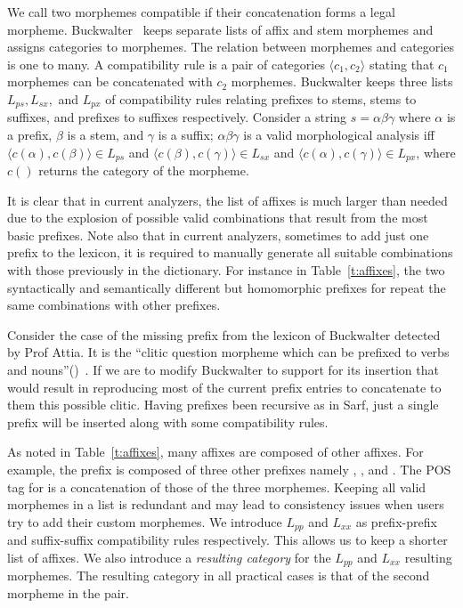 \documentclass[a4,12pt]{report}
\newcommand{\noTrRL}[1]{\transfalse\RL{#1}\transtrue}
\newcommand{\noTrnoVocRL}[1]{\transfalse\novocalize\noTrRL{#1}\vocalize\transtrue}
\begin{document}
We call two morphemes compatible if their concatenation
forms a legal morpheme. 
Buckwalter~\cite{Buckwalter:02} keeps separate lists 
of affix and stem morphemes and assigns categories to
morphemes. 
The relation between morphemes and categories is one 
to many. 
A compatibility rule is a pair of categories 
$\langle c_1, c_2\rangle$  stating that $c_1$ morphemes
can be concatenated with $c_2$ morphemes.
Buckwalter keeps three lists $L_{ps}, L_{sx},$ and $L_{px}$ 
of compatibility rules relating
prefixes to stems, stems to suffixes, and prefixes to suffixes
respectively. 
Consider a string $s=\alpha\beta\gamma$ where $\alpha$ is 
a prefix, $\beta$ is a stem, and $\gamma$ is a suffix;
$\alpha\beta\gamma$ is a 
valid morphological analysis iff
$\langle c(\alpha),c(\beta)\rangle \in L_{ps}$ and
$\langle c(\beta),c(\gamma)\rangle \in L_{sx}$ and
$\langle c(\alpha),c(\gamma)\rangle \in L_{px}$, where
$c()$ returns the category of the morpheme.

It is clear that in current analyzers, the list of affixes is much larger than needed
due to the explosion of possible valid combinations that result from the most basic 
prefixes. Note also that in current analyzers, sometimes to add just one prefix to the lexicon, it is required to
manually generate all suitable combinations with those previously in the dictionary.
For instance in Table~\ref{t:affixes}, the two syntactically and semantically different but homomorphic prefixes for 
repeat the same combinations with other prefixes.

Consider the case of the missing prefix from the lexicon of Buckwalter detected by Prof Attia. It is the 
``clitic question morpheme which can be prefixed to verbs and nouns''()~\cite{Attia:06b}.
If we are to modify Buckwalter to support for its insertion that would result in reproducing most of the current
prefix entries to concatenate to them this possible clitic. Having prefixes been recursive as in Sarf, just a single 
prefix will be inserted along with some compatibility rules.


As noted in Table~\ref{t:affixes}, many affixes are composed of other affixes. For example,
the prefix \noTrnoVocRL{wsy} is composed of three other prefixes
namely \noTrnoVocRL{w}, \noTrnoVocRL{s}, and \noTrnoVocRL{y}.
The POS tag for \noTrnoVocRL{wsy} is a concatenation
of those of the three morphemes. 
Keeping all valid morphemes in a list
is redundant and may lead to consistency issues when
users try to add their custom morphemes.
We introduce $L_{pp}$ and
$L_{xx}$ as prefix-prefix and suffix-suffix 
compatibility rules respectively.
This allows us to keep a shorter list of affixes. 
We also introduce a {\em resulting category}
for the $L_{pp}$ and  $L_{xx}$ resulting morphemes.
The resulting category in all practical cases
is that of the second morpheme in the pair. 
\end{document}
